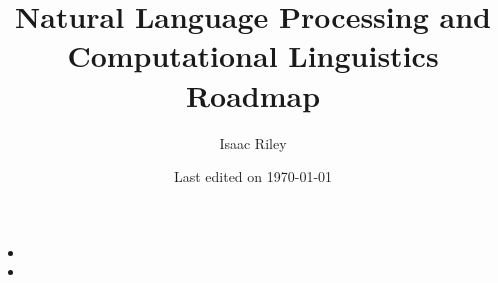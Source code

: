\documentclass[a4, 12pt]{article}
\title{Natural Language Processing and Computational Linguistics Roadmap}
\author{Isaac Riley}
\date{Last edited on \today}
\begin{document}
\maketitle
\begin{itemize}
    \item 
    \item 
\end{itemize}
\end{document}
